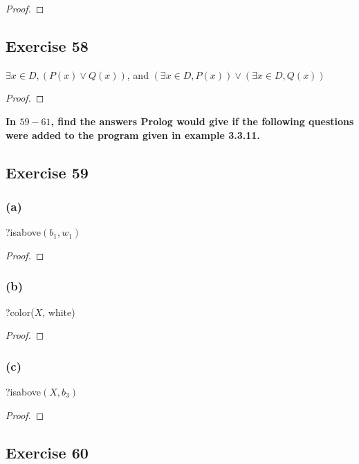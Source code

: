 \documentclass[14pt]{extarticle}
\newcommand{\te}{\exists}
\begin{document}
\begin{proof}

\end{proof}

\subsection{Exercise 58}
$\te x \in D, (P(x) \vee Q(x))$, and $(\te x \in D, P(x)) \vee (\te x \in D, Q(x))$

\begin{proof}

\end{proof}

{\bf \color{cyan} In $59-61$, find the answers Prolog would give if the following questions were added to the program given in example 3.3.11.}

\subsection{Exercise 59}

\subsubsection{(a)}
?isabove$(b_1, w_1)$

\begin{proof}

\end{proof}

\subsubsection{(b)}
?color($X$, white)

\begin{proof}

\end{proof}

\subsubsection{(c)}
?isabove$(X, b_3)$

\begin{proof}

\end{proof}

\subsection{Exercise 60}
\end{document}
